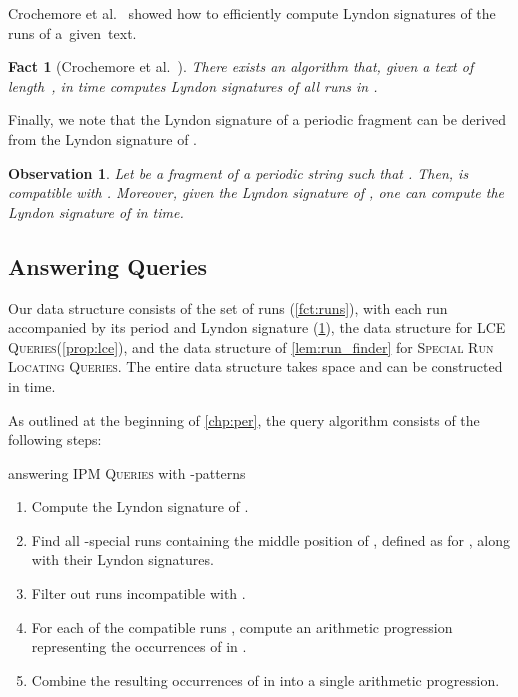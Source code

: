 \documentclass[a4paper]{article}
\newtheorem{fact}[theorem]{Fact}
\newtheorem{observation}[theorem]{Observation}
\theoremstyle{definition}
\theoremstyle{remark}
\newcommand{\IPM}{\textsc{IPM Queries}\xspace}
\newcommand{\LCEQ}{\textsc{LCE Queries}\xspace}
\begin{document}
Crochemore et al.~\cite{DBLP:journals/tcs/CrochemoreIKRRW14} showed how to efficiently compute
Lyndon signatures of the runs of a~given~text.

\begin{fact}[Crochemore et al.~\cite{DBLP:journals/tcs/CrochemoreIKRRW14}]\label{fct:compat}
There exists an algorithm that, given a text  of length~, in  time
computes Lyndon signatures of all runs in .
\end{fact}

Finally, we note that the Lyndon signature of a periodic fragment  
can be derived from the Lyndon signature of .
\begin{observation}\label{obs:compat}
Let  be a fragment of a periodic string  such that  .
Then,  is compatible with .
Moreover, given the Lyndon signature of , one can compute the Lyndon signature of  in  time.
\end{observation}

\subsection{Answering Queries}\label{sec:per_sum}

Our data structure consists of the set of runs  (\cref{fct:runs}), with each run accompanied by its period and Lyndon signature (\cref{fct:compat}), the data structure for \LCEQ (\cref{prop:lce}), and the data structure of \cref{lem:run_finder} for \textsc{Special Run Locating Queries}.
The entire data structure takes  space and can be constructed in  time.

As outlined at the beginning of \cref{chp:per}, the query algorithm consists of the following steps:

\begin{center}
\begin{minipage}{14cm}
 answering \IPM with -patterns

  \begin{enumerate}[label=(\Alph*)]
    \item\label{step:A} Compute the Lyndon signature of .
    \item\label{step:B} Find all -special runs  containing the middle position of ,
      defined as  for , along with their Lyndon signatures.
    \item\label{step:C} Filter out runs  incompatible with .
    \item\label{step:D}
	  For each of the compatible runs , compute an arithmetic progression representing the occurrences of  in .
	  \item\label{step:E}
      Combine the resulting occurrences of  in  into a single arithmetic progression.
  \end{enumerate}
  \end{minipage}
\end{center}
\end{document}
